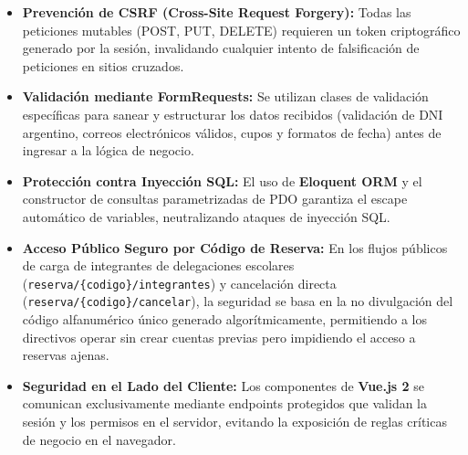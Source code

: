 \begin{itemize}
    \item \textbf{Prevención de CSRF (Cross-Site Request Forgery):} Todas las peticiones mutables (POST, PUT, DELETE) requieren un token criptográfico generado por la sesión, invalidando cualquier intento de falsificación de peticiones en sitios cruzados.
    \item \textbf{Validación mediante FormRequests:} Se utilizan clases de validación específicas para sanear y estructurar los datos recibidos (validación de DNI argentino, correos electrónicos válidos, cupos y formatos de fecha) antes de ingresar a la lógica de negocio.
    \item \textbf{Protección contra Inyección SQL:} El uso de \textbf{Eloquent ORM} y el constructor de consultas parametrizadas de PDO garantiza el escape automático de variables, neutralizando ataques de inyección SQL.
    \item \textbf{Acceso Público Seguro por Código de Reserva:} En los flujos públicos de carga de integrantes de delegaciones escolares (\texttt{reserva/\{codigo\}/integrantes}) y cancelación directa (\texttt{reserva/\{codigo\}/cancelar}), la seguridad se basa en la no divulgación del código alfanumérico único generado algorítmicamente, permitiendo a los directivos operar sin crear cuentas previas pero impidiendo el acceso a reservas ajenas.
    \item \textbf{Seguridad en el Lado del Cliente:} Los componentes de \textbf{Vue.js 2} se comunican exclusivamente mediante endpoints protegidos que validan la sesión y los permisos en el servidor, evitando la exposición de reglas críticas de negocio en el navegador.
\end{itemize}

